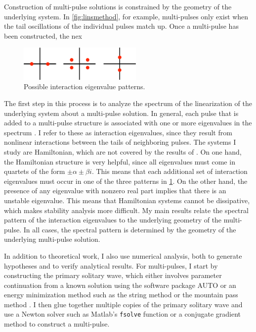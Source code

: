 \documentclass[12pt,reqno,oneside]{article}
\begin{document}
Construction of multi-pulse solutions is constrained by the geometry of the underlying system. In \cref{fig:linsmethod}, for example, multi-pulses only exist when the tail oscillations of the individual pulses match up. Once a multi-pulse has been constructed, the nex

\begin{figure}
    \includegraphics[width=6cm]{images/inteigpattern.eps}
    \caption{Possible interaction eigenvalue patterns.} 
    \label{fig:inteigpattern}
\end{figure}
The first step in this process is to analyze the spectrum of the linearization of the underlying system about a multi-pulse solution. In general, each pulse that is added to a multi-pulse structure is associated with one or more eigenvalues in the spectrum \cite{Sandstede1998}. I refer to these as interaction eigenvalues, since they result from nonlinear interactions between the tails of neighboring pulses. The systems I study are Hamiltonian, which are not covered by the results of \cite{Sandstede1998}. On one hand, the Hamiltonian structure is very helpful, since all eigenvalues must come in quartets of the form $\pm \alpha \pm \beta i$. This means that each additional set of interaction eigenvalues must occur in one of the three patterns in \cref{fig:inteigpattern}. On the other hand, the presence of any eigenvalue with nonzero real part implies that there is an unstable eigenvalue. This means that Hamiltonian systems cannot be dissipative, which makes stability analysis more difficult. My main results relate the spectral pattern of the interaction eigenvalues to the underlying geometry of the multi-pulse. In all cases, the spectral pattern is determined by the geometry of the underlying multi-pulse solution. 

In addition to theoretical work, I also use numerical analysis, both to generate hypotheses and to verify analytical results. For multi-pulses, I start by constructing the primary solitary wave, which either involves parameter continuation from a known solution using the software package AUTO or an energy minimization method such as the string method \cite{Chamard2011} or the mountain pass method \cite{Chen1997}. I then glue together multiple copies of the primary solitary wave and use a Newton solver such as Matlab's \texttt{fsolve} function or a conjugate gradient method to construct a multi-pulse.
\end{document}
